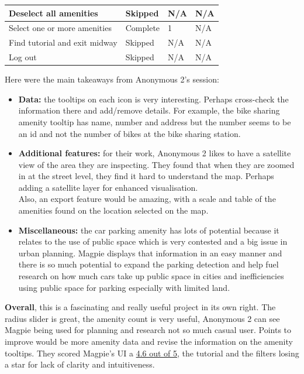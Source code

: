 \begin{table}[h!]
\begin{tabular}{|p{}|p{}|p{}|p{}|}
        \hline
        Deselect all amenities        & Skipped         & N/A                 & N/A                             \\
        \hline
        Select one or more amenities  & Complete        & 1                   & N/A                             \\
        \hline
        Find tutorial and exit midway & Skipped         & N/A                 & N/A                             \\
        \hline
        Log out                       & Skipped         & N/A                 & N/A                             \\
        \hline
    \end{tabular}
\end{table}

\newpage Here were the main takeaways from Anonymous 2's session:
\begin{itemize}
    \item \textbf{Data:} the tooltips on each icon is very interesting. Perhaps cross-check the information there and add/remove details. For example, the bike sharing amenity tooltip has name, number and address but the number seems to be an id and not the number of bikes at the bike sharing station.\\
    \item \textbf{Additional features:} for their work, Anonymous 2 likes to have a satellite view of the area they are inspecting. They found that when they are zoomed in at the street level, they find it hard to understand the map. Perhaps adding a satellite layer for enhanced visualisation.\\ Also, an export feature would be amazing, with a scale and table of the amenities found on the location selected on the map.\\
    \item \textbf{Miscellaneous:} the car parking amenity has lots of potential because it relates to the use of public space which is very contested and a big issue in urban planning. Magpie displays that information in an easy manner and there is so much potential to expand the parking detection and help fuel research on how much cars take up public space in cities and inefficiencies using public space for parking especially with limited land.
\end{itemize}
\textbf{Overall}, this is a fascinating and really useful project in its own right. The radius slider is great, the amenity count is very useful, Anonymous 2 can see Magpie being used for planning and research not so much casual user. Points to improve would be more amenity data and revise the information on the amenity tooltips. They scored Magpie's UI a \underline{4.6 out of 5}, the tutorial and the filters losing a star for lack of clarity and intuitiveness.
